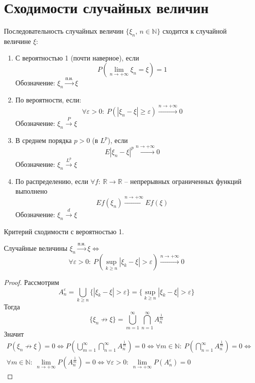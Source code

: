 \section{Сходимости случайных величин}
\begin{definition}
	Последовательность случайных величин $\{\xi_n,\, n \in \mathbb{N}\}$ сходится к случайной величине $\xi$:
	\begin{enumerate}
		\item С вероятностью 1 (почти наверное), если
		      \[P\left(\lim_{n \to +\infty}\xi_n = \xi\right) = 1\]
		      Обозначение: $\xi_n \stackrel{\text{п.н.}}{\to} \xi$

		\item По вероятности, если:
		      \[\forall \varepsilon > 0 :\: P(|\xi_n - \xi| \geq \varepsilon) \stackrel{n \to +\infty}{\to} 0\]
		      Обозначение: $\xi_n \stackrel{P}{\to} \xi$

		\item В среднем порядка $p > 0$ (в $L^p$), если
		      \[E|\xi_n - \xi|^p \stackrel{n \to +\infty}{\to} 0 \]
		      Обозначение: $\xi_n \stackrel{L^p}{\to} \xi$

		\item По распределению, если $\forall f:\: \mathbb{R} \to \mathbb{R}$ -- непрерывных ограниченных функций выполнено
		      \[Ef(\xi_n) \stackrel{n \to +\infty}{\to} Ef(\xi)\]
		      Обозначение: $\xi_n \stackrel{d}{\to} \xi$
	\end{enumerate}
\end{definition}

\begin{theorem}
	Критерий сходимости с вероятностью 1.

	Случайные величины $\xi_n \stackrel{\text{п.н.}}{\to} \xi \Leftrightarrow$
	\[\forall \varepsilon > 0:\: P\left(\sup_{k \geq n} |\xi_k - \xi| > \varepsilon\right) \stackrel{n \to +\infty}{\to} 0\]
\end{theorem}

\begin{proof}
	Рассмотрим
	\[A_n^\varepsilon = \bigcup_{k \geq n}\{|\xi_k - \xi| > \varepsilon\} = \{\sup_{k \geq n} |\xi_k - \xi| > \varepsilon \}\]
	Тогда
	\[\{\xi_n \not\to \xi\} = \bigcup_{m = 1}^\infty \bigcap_{n = 1}^\infty A_n^{\frac{1}{m}}\]
	Значит
	\begin{align*}
		P(\xi_n \not\to \xi) = 0 \Leftrightarrow P\left(\bigcup_{m = 1}^\infty \bigcap_{n = 1}^\infty A_n^{\frac{1}{m}}\right) = 0 \Leftrightarrow \forall m \in \mathbb{N} :\: P\left(\bigcap_{n = 1}^\infty A_n^{\frac{1}{m}}\right) = 0 \Leftrightarrow \\
		\forall m \in \mathbb{N}:\: \lim_{n \to +\infty} P\left(A_n^{\frac{1}{m}}\right) = 0 \Leftrightarrow \forall \varepsilon > 0:\: \lim_{n \to +\infty}P(A_n^\varepsilon) = 0
	\end{align*}
\end{proof}

